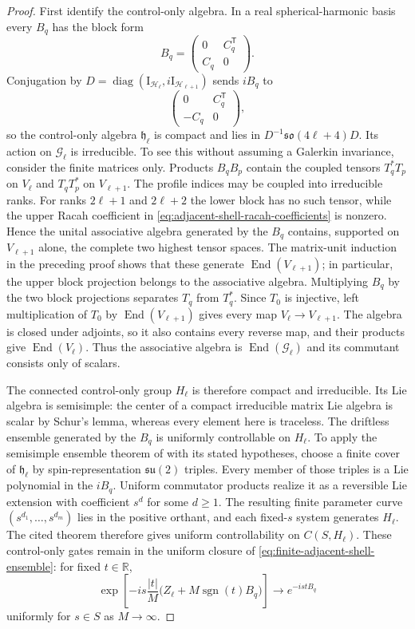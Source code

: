 \documentclass[11pt]{article}
\theoremstyle{remark}
\newcommand{\Id}{\mathrm I}
\begin{document}
\begin{proof}
First identify the control-only algebra.  In a real spherical-harmonic
basis every $B_q$ has the block form
\[
 B_q=\begin{pmatrix}0&C_q^{\mathsf T}\\ C_q&0\end{pmatrix}.
\]
Conjugation by
$D=\operatorname{diag}(\Id_{\mathcal H_\ell},
i\Id_{\mathcal H_{\ell+1}})$ sends $iB_q$ to
\[
 \begin{pmatrix}0&C_q^{\mathsf T}\\-C_q&0\end{pmatrix},
\]
so the control-only algebra $\mathfrak h_\ell$ is compact and lies in
$D^{-1}\mathfrak{so}(4\ell+4)D$.  Its action on $\mathcal G_\ell$ is
irreducible.  To see this without assuming a Galerkin invariance, consider
the finite matrices only.  Products $B_qB_p$ contain the coupled tensors
$T_q^\ast T_p$ on $V_\ell$ and $T_qT_p^\ast$ on $V_{\ell+1}$.  The profile
indices may be coupled into irreducible ranks.  For ranks $2\ell+1$ and
$2\ell+2$ the lower block has no such tensor, while the upper Racah
coefficient in \eqref{eq:adjacent-shell-racah-coefficients} is nonzero.
Hence the unital associative algebra generated by the $B_q$ contains,
supported on $V_{\ell+1}$ alone, the complete two highest tensor spaces.
The matrix-unit induction in the preceding proof shows that these generate
$\operatorname{End}(V_{\ell+1})$; in particular, the upper block projection
belongs to the associative algebra.  Multiplying $B_q$ by the two block
projections separates $T_q$ from $T_q^\ast$.  Since $T_0$ is injective,
left multiplication of $T_0$ by
$\operatorname{End}(V_{\ell+1})$ gives every map
$V_\ell\to V_{\ell+1}$.  The algebra is closed under adjoints, so it also
contains every reverse map, and their products give
$\operatorname{End}(V_\ell)$.  Thus the associative algebra is
$\operatorname{End}(\mathcal G_\ell)$ and its commutant consists only of
scalars.

The connected control-only group $H_\ell$ is therefore compact and
irreducible.  Its Lie algebra is semisimple: the center of a compact
irreducible matrix Lie algebra is scalar by Schur's lemma, whereas every
element here is traceless.  The driftless ensemble generated by the $B_q$
is uniformly controllable on $H_\ell$.  To apply the semisimple ensemble
theorem of \cite{LiZhang2020} with its stated hypotheses, choose a finite
cover of $\mathfrak h_\ell$ by spin-representation $\mathfrak{su}(2)$
triples.  Every member of those triples is a Lie polynomial in the $iB_q$.
Uniform commutator products realize it as a reversible Lie extension with
coefficient $s^d$ for some $d\geq1$.  The resulting finite parameter curve
$(s^{d_1},\ldots,s^{d_m})$ lies in the positive orthant, and each fixed-$s$
system generates $H_\ell$.  The cited theorem therefore gives uniform
controllability on $C(S,H_\ell)$.  These control-only gates remain in the
uniform closure of \eqref{eq:finite-adjacent-shell-ensemble}: for fixed
$t\in\mathbb R$,
\[
 \exp\!\left[
  -is\frac{|t|}{M}
  \bigl(Z_\ell+M\operatorname{sgn}(t)B_q\bigr)
 \right]
 \longrightarrow e^{-istB_q}
\]
uniformly for $s\in S$ as $M\to\infty$.


\end{proof}
\end{document}
